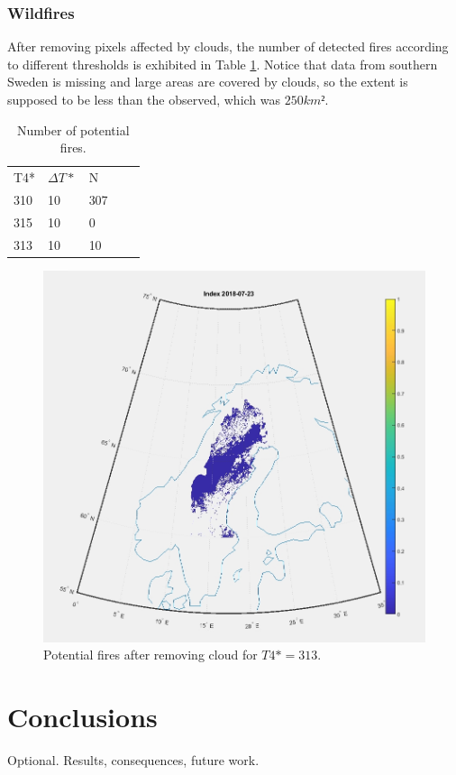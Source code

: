 \documentclass[a4paper, article, oneside, UKenglish]{memoir}
\newcommand{\0}{\mathbf{0}}
\newcommand{\1}{\mathbf{1}}
\begin{document}
\subsection{Wildfires}

After removing pixels affected by clouds, the number of detected fires according to different thresholds is exhibited in Table \ref{tab:num_fires}. Notice that data from southern Sweden is missing and large areas are covered by clouds, so the extent is supposed to be less than the observed, which was $250 km²$.

\begin{table}[]
\centering
\begin{tabular}{lllll}
T4* & $\Delta T *$ & N   &  &  \\
310 & 10                        & 307 &  &  \\
315 & 10                        & 0   &  &  \\
313 & 10                        & 10  &  & 
\end{tabular}
\caption{Number of potential fires.}
\label{tab:num_fires}
\end{table}

\begin{figure}
    \centering
    \includegraphics[scale=0.3]{fires/23_07_t4_313.jpg}
    \caption{Potential fires after removing cloud for $T4* = 313$.}
    \label{fig:fires_313}
\end{figure}


\chapter{Conclusions}


Optional. Results, consequences, future work.






\printbibliography
\end{document}
